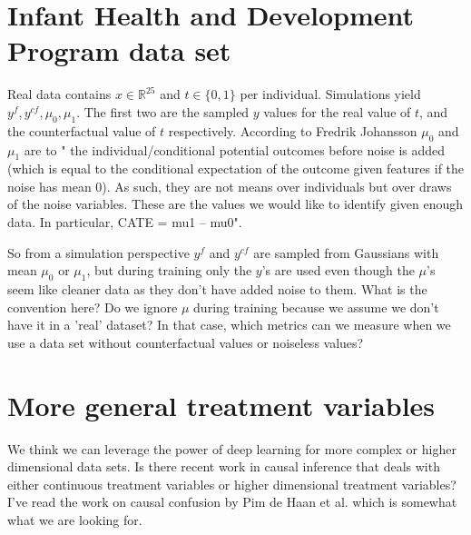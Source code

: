 \documentclass{article}
\begin{document}



\newpage
\section*{Infant Health and Development Program data set}
Real data contains $x \in \mathbb{R}^{25}$ and $t \in \{0, 1\}$ per individual. Simulations yield $y^f, y^{cf}, \mu_0, \mu_1$. The first two are the sampled $y$ values for the real value of $t$, and the counterfactual value of $t$ respectively. According to Fredrik Johansson $\mu_0$ and $\mu_1$ are to " the individual/conditional potential outcomes before noise is added (which is equal to the conditional expectation of the outcome given features if the noise has mean 0). As such, they are not means over individuals but over draws of the noise variables. These are the values we would like to identify given enough data. In particular, CATE = mu1 – mu0".

So from a simulation perspective $y^f$ and $y^{cf}$ are sampled from Gaussians with mean $\mu_0$ or $\mu_1$, but during training only the $y$'s are used even though the $\mu$'s seem like cleaner data as they don't have added noise to them. What is the convention here? Do we ignore $\mu$ during training because we assume we don't have it in a 'real' dataset? In that case, which metrics can we measure when we use a data set without counterfactual values or noiseless values?

\vspace{5cm}

\section*{More general treatment variables}
We think we can leverage the power of deep learning for more complex or higher dimensional data sets. Is there recent work in causal inference that deals with either continuous treatment variables or higher dimensional treatment variables? I've read the work on causal confusion by Pim de Haan et al. which is somewhat what we are looking for.
\end{document}
